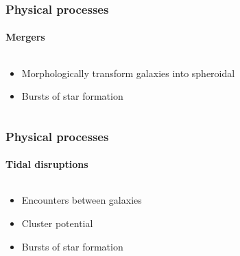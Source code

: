 \begin{frame}
    \frametitle{Physical processes}
    \framesubtitle{Mergers}
    \begin{columns}
        \begin{column}{0.5\textwidth}
            \begin{block}{}
                \begin{itemize}
                    \item Morphologically transform galaxies into
                        spheroidal
                    \item Bursts of star formation
                \end{itemize}
            \end{block}
        \end{column}
        \begin{column}{0.5\textwidth}
        \end{column}
    \end{columns}
\end{frame}

\begin{frame}
    \frametitle{Physical processes}
    \framesubtitle{Tidal disruptions}
    \begin{columns}
        \begin{column}{0.5\textwidth}
            \begin{block}{}
                \begin{itemize}
                    \item Encounters between galaxies
                    \item Cluster potential
                    \item Bursts of star formation
                \end{itemize}
            \end{block}
        \end{column}
        \begin{column}{0.5\textwidth}
        \end{column}
    \end{columns}
\end{frame}

